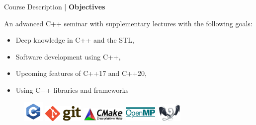 


\begin{frame}{Course Description | \textbf{Objectives}}

	An advanced C++ seminar \cite{stroustrup2000c++} with supplementary lectures with the following goals:
	
	\begin{itemize}
		\item Deep knowledge in C++ and the STL,
		\item Software development using C++,
		\item Upcoming features of C++17 and C++20,
		\item Using C++ libraries and frameworks
	\end{itemize}
	
	\vfill
	
	\begin{figure}
		\includegraphics[width=0.09\textwidth]{./images/cpp.pdf}
		\hfill
		\includegraphics[width=0.17\textwidth]{./images/git.jpg}
		\hfill
		\includegraphics[width=0.19\textwidth]{./images/cmake.jpg}
		\hfill
		\includegraphics[width=0.14\textwidth]{./images/openmp.png}
		\hfill
		\includegraphics[width=0.11\textwidth]{./images/llvm.png}
	\end{figure}
\end{frame}


